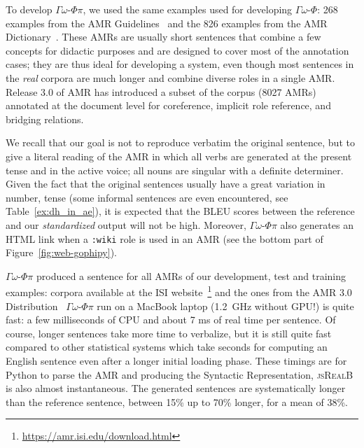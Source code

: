 \documentclass[12pt]{article}
\newcommand{\systeme}[1]{\textsc{#1}}
\newcommand{\jsr}{\systeme{jsRealB}}
\newcommand{\gophi}{$\Gamma\omega$-$\Phi$}
\newcommand{\gophipy}{$\Gamma\omega$-$\Phi\pi$}
\newcommand{\representation}[1]{\textsf{#1}}
\newcommand{\AMR}{\representation{AMR}}
\newcommand{\syntr}{\representation{Syntactic Representation}}
\begin{document}
To develop \gophipy{}, we used the same examples used for developing \gophi{}: 268 examples from the AMR Guidelines~\cite{AMR-Guidelines} and the 826 examples from the AMR Dictionary~\cite{AMR-Dictionary}. These \AMR{}s are usually short sentences that combine a few concepts for didactic purposes and are designed to cover most of the annotation cases; they are thus ideal for developing a system, even though most sentences in the \emph{real} corpora are much longer and combine diverse roles in a single \AMR{}. Release 3.0 of \AMR{} has introduced a subset of the corpus (8027 AMRs)  annotated at the document level for coreference, implicit role reference, and bridging relations.

We recall that our goal is not to reproduce verbatim the original sentence, but to give a literal reading of the \AMR{} in which all verbs are generated at the present tense and in the active voice; all nouns are singular with a definite determiner. Given the fact that the original sentences usually have a great variation in number, tense (some informal sentences are even encountered, see Table~\ref{ex:dh_in_ae}), it is expected that the BLEU scores between the reference and our \emph{standardized} output will not be high. Moreover, \gophipy{} also generates an HTML link when  a \texttt{:wiki} role is used in an AMR (see the bottom part of Figure~\ref{fig:web-gophipy}).

\gophipy{} produced a sentence for all \AMR{}s of our development, test and training examples:  corpora available at the ISI website~\footnote{\url{https://amr.isi.edu/download.html}} and the ones from the AMR 3.0 Distribution~\cite{AMR-Release3} 
\gophipy{} run on a MacBook laptop (1.2~GHz without GPU!) is quite fast: a few milliseconds of CPU and about 7 ms of real time per sentence. Of course, longer sentences take more time to verbalize, but it is still quite fast compared to other statistical systems which take seconds for computing an English sentence even after a longer initial loading phase. These timings are for Python to parse the AMR and producing the \syntr{}, \jsr{} is also almost instantaneous.
The generated sentences are systematically longer than the reference sentence, between 15\% up to 70\% longer, for a mean of 38\%.
\end{document}
